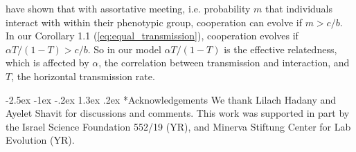 \documentclass[12pt]{extarticle}
\makeatletter
\renewcommand\section{\@startsection {section}{1}{\z@}%
     {-2.5ex \@plus -1ex \@minus -.2ex}%
     {1.3ex \@plus.2ex}%
    {\Large\bfseries}}
\makeatother
\begin{document}
\citet{Eshel1982} have shown that with assortative meeting, i.e. probability $m$ that individuals interact with within their phenotypic group, cooperation can evolve if $m > c/b$.
In our Corollary 1.1 (\autoref{eq:equal_transmission}), cooperation evolves if $\alpha T / (1-T) > c/b$. So in our model $\alpha T/(1-T)$ is the effective relatedness, which is affected by $\alpha$, the correlation between transmission and interaction, and $T$, the horizontal transmission rate.





\pagebreak
{\small
\section*{Acknowledgements}
We thank Lilach Hadany and Ayelet Shavit for discussions and comments.
This work was supported in part by
the Israel Science Foundation 552/19 (YR),
and Minerva Stiftung Center for Lab Evolution (YR).
}
\end{document}
